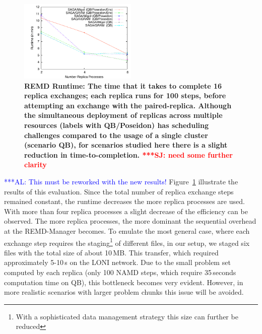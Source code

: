 \documentclass{rspublic}
\newcommand{\up}{}%
\newcommand{\alnote}[1]{ {\textcolor{blue} { ***AL: #1 }}}
\newcommand{\jhanote}[1]{ {\textcolor{red} { ***SJ: #1 }}}
\newcommand{\alnote}[1]{}
\newcommand{\jhanote}[1]{}
\begin{document}
\begin{figure}[htb]
    \centering
    \hspace*{-20pt}
        \includegraphics[width=0.5\textwidth]{performance/perf_remd.pdf}
        \caption{\footnotesize \bf REMD Runtime: 
         The time that it takes to complete 16 replica exchanges; 
each replica runs for 100 steps, before attempting an exchange with
the paired-replica. Although the simultaneous deployment of
          replicas across multiple resources (labels with QB/Poseidon)
          has scheduling challenges compared to the usage of a single
          cluster (scenario QB), for scenarios studied here there is a
          slight reduction in time-to-completion.
          \jhanote{need some further clarity} \up}
    \label{fig:performance_perf_runtime}
\end{figure}     
\alnote{This must be reworked with the new results!}
Figure~\ref{fig:performance_perf_runtime} illustrate the results of
this evaluation. Since the total number of replica exchange steps
remained constant, the runtime decreases the more replica processes
are used.  With more than four replica processes a slight
decrease of the efficiency can be observed.
The more replica processes, the more dominant the sequential overhead
at the REMD-Manager becomes. To emulate the most general case, where
each exchange step requires the staging\footnote{With a sophisticated
  data management strategy this size can further be reduced} of
different files, in our setup, we staged six files with the total size
of about 10\,MB. This transfer, which required approximately 5-10\,s
on the LONI network.  Due to the small problem set computed by each
replica (only 100 NAMD steps, which require 35\,seconds computation
time on QB), this bottleneck becomes very evident. However, in more
realistic scenarios with larger problem chunks this issue will be
avoided.
\end{document}
